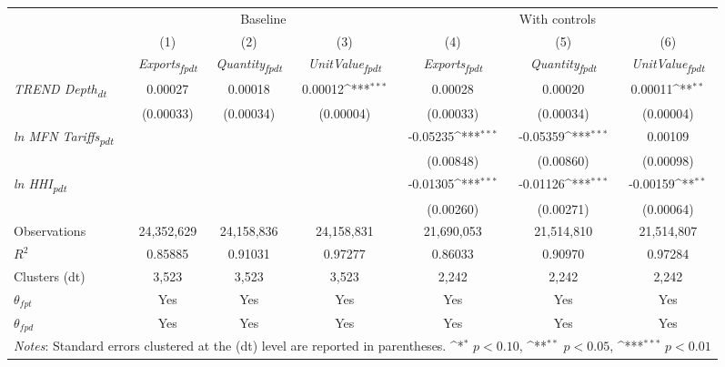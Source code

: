 {
\def\sym#1{\ifmmode^{#1}\else\(^{#1}\)\fi}
\begin{tabular}{l*{6}{c}}
\toprule
&\multicolumn{3}{c}{Baseline}&\multicolumn{3}{c}{With controls}\\\cmidrule(lr){2-4}\cmidrule(lr){5-7}
&(1)&(2)&(3)&(4)&(5)&(6)\\
&\textit{Exports\textsubscript{fpdt}}&\textit{Quantity\textsubscript{fpdt}}&\textit{UnitValue\textsubscript{fpdt}}&\textit{Exports\textsubscript{fpdt}}&\textit{Quantity\textsubscript{fpdt}}&\textit{UnitValue\textsubscript{fpdt}}\\
\midrule
\textit{TREND Depth\textsubscript{dt}} & 0.00027 & 0.00018 & 0.00012\sym{***} & 0.00028 & 0.00020 & 0.00011\sym{**}\\
 & (0.00033) & (0.00034) & (0.00004) & (0.00033) & (0.00034) & (0.00004)\\
\addlinespace
\textit{ln MFN Tariffs\textsubscript{pdt}} &  &  &  & -0.05235\sym{***} & -0.05359\sym{***} & 0.00109\\
 &  &  &  & (0.00848) & (0.00860) & (0.00098)\\
\addlinespace
\textit{ln HHI\textsubscript{pdt}} &  &  &  & -0.01305\sym{***} & -0.01126\sym{***} & -0.00159\sym{**}\\
 &  &  &  & (0.00260) & (0.00271) & (0.00064)\\
\midrule
Observations & 24,352,629 & 24,158,836 & 24,158,831 & 21,690,053 & 21,514,810 & 21,514,807\\
$R^{2}$ & 0.85885 & 0.91031 & 0.97277 & 0.86033 & 0.90970 & 0.97284\\
Clusters (dt) & 3,523 & 3,523 & 3,523 & 2,242 & 2,242 & 2,242\\
$\theta_{fpt}$ & Yes & Yes & Yes & Yes & Yes & Yes\\
$\theta_{fpd}$ & Yes & Yes & Yes & Yes & Yes & Yes\\
\bottomrule
\multicolumn{7}{l}{\footnotesize \textit{Notes}: Standard errors clustered at the (dt) level are reported in parentheses. \sym{*} \(p<0.10\), \sym{**} \(p<0.05\), \sym{***} \(p<0.01\)}\\
\end{tabular}
}
